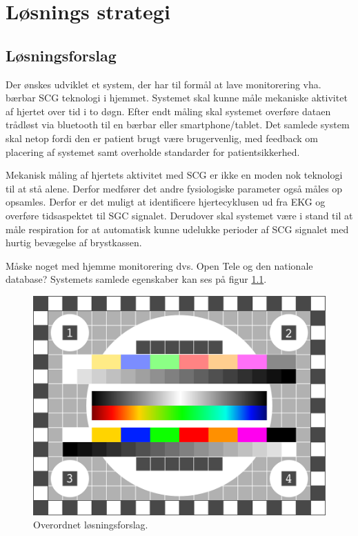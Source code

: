 \chapter{Løsnings strategi}

\section{Løsningsforslag}\label{loesningsforslag}

Der ønskes udviklet et system, der har til formål at lave monitorering vha. bærbar SCG teknologi i hjemmet. Systemet skal kunne måle mekaniske aktivitet af hjertet over tid i to døgn. Efter endt måling skal systemet overføre dataen trådløst via bluetooth til en bærbar eller smartphone/tablet. Det samlede system skal netop fordi den er patient brugt være brugervenlig, med feedback om placering af systemet samt overholde standarder for patientsikkerhed. 

Mekanisk måling af hjertets aktivitet med SCG er ikke en moden nok teknologi til at stå alene. Derfor medfører det andre fysiologiske parameter også måles op opsamles. Derfor er det muligt at identificere hjertecyklusen ud fra EKG og overføre tidsaspektet til SGC signalet. Derudover skal systemet være i stand til at måle respiration for at automatisk kunne udelukke perioder af SCG signalet med hurtig bevægelse af brystkassen. 

Måske noget med hjemme monitorering dvs. Open Tele og den nationale database? 
Systemets samlede egenskaber kan ses på figur \ref{fig:loesningsforslag}. 

\begin{figure}[H] %
\begin{center}
\includegraphics[width=1\textwidth]{figures/test}
\end{center}
\caption{Overordnet løsningsforslag. }
\label{fig:loesningsforslag}
\end{figure}


